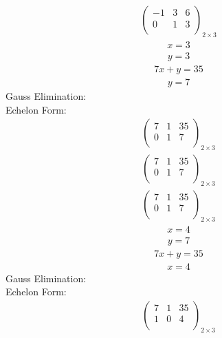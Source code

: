 \documentclass{article}
\begin{document}
\begin{align*}
\left(
\begin{array}{cc|c}
-1 & 3 & 6\\
0 & 1 & 3\\
\end{array}
\right)_{2\times 3}
\end{align*}
\begin{align*}
x=3\end{align*}
\begin{align*}
y=3\end{align*}
\begin{align*}
7x + y=35\end{align*}
\begin{align*}
y=7\end{align*}
Gauss Elimination:\\
Echelon Form:\\
\begin{align*}
\left(
\begin{array}{cc|c}
7 & 1 & 35\\
0 & 1 & 7\\
\end{array}
\right)_{2\times 3}
\end{align*}
\begin{align*}
\left(
\begin{array}{cc|c}
7 & 1 & 35\\
0 & 1 & 7\\
\end{array}
\right)_{2\times 3}
\end{align*}
\begin{align*}
\left(
\begin{array}{cc|c}
7 & 1 & 35\\
0 & 1 & 7\\
\end{array}
\right)_{2\times 3}
\end{align*}
\begin{align*}
x=4\end{align*}
\begin{align*}
y=7\end{align*}
\begin{align*}
7x + y=35\end{align*}
\begin{align*}
x=4\end{align*}
Gauss Elimination:\\
Echelon Form:\\
\begin{align*}
\left(
\begin{array}{cc|c}
7 & 1 & 35\\
1 & 0 & 4\\
\end{array}
\right)_{2\times 3}
\end{align*}
\end{document}
